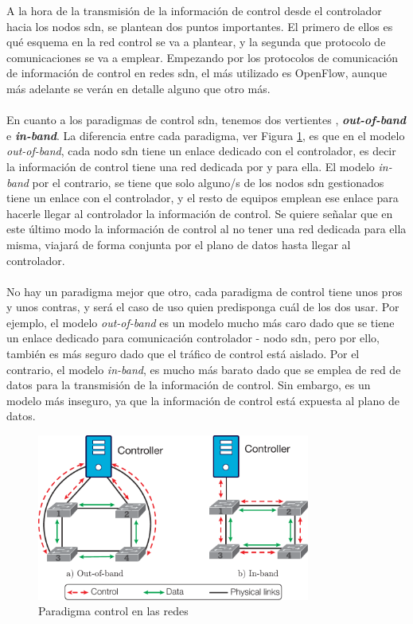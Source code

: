 A la hora de la transmisión de la información de control desde el controlador hacia los nodos \gls{sdn}, se plantean dos puntos importantes. El primero de ellos es qué esquema en la red control se va a plantear, y la segunda que protocolo de comunicaciones se va a emplear. Empezando por los protocolos de comunicación de información de control en redes \gls{sdn}, el más utilizado es OpenFlow, aunque más adelante se verán en detalle alguno que otro más.\\
\\
En cuanto a los paradigmas de control \gls{sdn}, tenemos dos vertientes \cite{carrascal2023comprehensive}, \textbf{\textit{out-of-band}} e \textbf{\textit{in-band}}. La diferencia entre cada paradigma, ver Figura \ref{fig:sdnParadigControl}, es que en el modelo \textit{out-of-band}, cada nodo \gls{sdn} tiene un enlace dedicado con el controlador, es decir la información de control tiene una red dedicada por y para ella. El modelo \textit{in-band} por el contrario, se tiene que solo alguno/s de los nodos \gls{sdn} gestionados tiene un enlace con el controlador, y el resto de equipos emplean ese enlace para hacerle llegar al controlador la información de control. Se quiere señalar que en este último modo la información de control al no tener una red dedicada para ella misma, viajará de forma conjunta por el plano de datos hasta llegar al controlador. \\
\\
No hay un paradigma mejor que otro, cada paradigma de control tiene unos pros y unos contras, y será el caso de uso quien predisponga cuál de los dos usar. Por ejemplo, el modelo \textit{out-of-band} es un modelo mucho más caro dado que se tiene un enlace dedicado para comunicación controlador - nodo \gls{sdn}, pero por ello, también es más seguro dado que el tráfico de control está aislado. Por el contrario, el modelo \textit{in-band}, es mucho más barato dado que se emplea de red de datos para la transmisión de la información de control. Sin embargo, es un modelo más inseguro, ya que la información de control está expuesta al plano de datos.
\newpage
\begin{figure}[ht]
    \centering
    \includegraphics[width=0.8\textwidth]{archivos/img/intro/InBandOutBandScheme.pdf}
    \caption{Paradigma control en las redes  \cite{carrascal2023comprehensive}}
    \label{fig:sdnParadigControl}
\end{figure}

